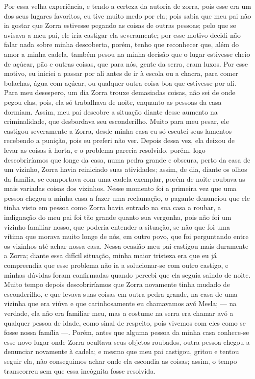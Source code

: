 Por essa velha experiência, e tendo a certeza da autoria de zorra, pois esse era um dos seus lugares favoritos, eu tive muito medo por ela; pois sabia que meu pai não ia gostar que Zorra estivesse pegando as coisas de outras pessoas; pelo que se avisava a meu pai, ele iria castigar ela severamente; por esse motivo decidi não falar nada sobre minha descoberta, porém, tenho que reconhecer que, além do amor a minha cadela, também pesou na minha decisão que o lugar estivesse cheio de açúcar, pão e outras coisas, que para nós, gente da serra, eram luxos. Por esse motivo, eu iniciei a passar por ali antes de ir à escola ou a chacra, para comer bolachas, água com açúcar, ou qualquer outra coisa boa que estivesse por ali. 
Para meu desespero, um dia Zorra trouxe demasiadas coisas, não sei de onde pegou elas, pois, ela só trabalhava de noite, enquanto as pessoas da casa dormiam. Assim, meu pai descobre a situação diante desse aumento na criminalidade, que desbordava seu esconderilho.
Muito para meu pesar, ele castigou severamente a Zorra, desde minha casa eu só escutei seus lamentos recebendo a punição, pois eu preferi não ver.
Depois dessa vez, ela deixou de  levar as coisas à horta, e o problema parecia resolvido, porém, logo descobriríamos que longe da casa, numa pedra grande e obscura, perto da casa de um vizinho, Zorra havia reiniciado suas atividades; assim, de dia, diante os olhos da família, se comportava com uma cadela exemplar, porém de noite roubava as mais variadas coisas dos vizinhos.
Nesse momento foi a primeira vez que uma pessoa chegou a minha casa a fazer uma reclamação, o pagante denunciou que ele tinha visto em pessoa como Zorra havia entrado na sua casa a roubar, a indignação do meu pai foi tão grande quanto sua vergonha, pois não foi um vizinho familiar nosso, que poderia entender a situação, se não que foi uma vítima que morava muito longe de nós, em outro povo, que foi perguntando entre os vizinhos até achar nossa casa.
Nessa ocasião meu pai castigou mais duramente a Zorra; diante essa difícil situação, minha maior tristeza era que eu já compreendia que esse problema não ia a solucionar-se com outro castigo, e minhas dúvidas foram confirmadas quando percebi que ela seguia saindo de noite. 
Muito tempo depois descobriríamos que Zorra novamente tinha mudado de esconderilho, e que levava suas coisas em outra pedra grande, na casa de uma vizinha que era viúva e que carinhosamente eu chamavamos avó Mesla; --- na verdade, ela não era familiar meu, mas a costume na serra era chamar avó a qualquer pessoa de idade, como sinal de respeito, pois vivemos com eles como se fosse nossa família ---.
Porém, antes que alguma pessoa da minha casa conhece-se esse novo lugar onde Zorra ocultava seus objetos roubados, outra pessoa chegou a denunciar novamente à cadela; e mesmo que meu pai castigou, gritou e tentou seguir ela, não conseguimos achar onde ela escondia as coisas; assim, o tempo transcorreu sem que essa incógnita fosse resolvida. 

